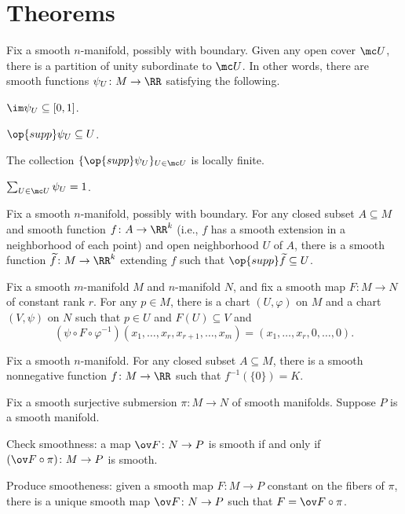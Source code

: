\documentclass{article}
\begin{document}
\section{Theorems}
\begin{theorem}
	Fix a smooth $n$-manifold, possibly with boundary. Given any open cover $\mc U$, there is a partition of unity subordinate to $\mc U$. In other words, there are smooth functions $\psi_U\colon M\to\RR$ satisfying the following.
	\begin{listalph}
		\item $\im\psi_U\subseteq[0,1]$.
		\item $\op{supp}\psi_U\subseteq U$.
		\item The collection $\{\op{supp}\psi_U\}_{U\in\mc U}$ is locally finite.
		\item $\sum_{U\in\mc U}\psi_U=1$.
	\end{listalph}
\end{theorem}
\begin{corollary}
	Fix a smooth $n$-manifold, possibly with boundary. For any closed subset $A\subseteq M$ and smooth function $f\colon A\to\RR^k$ (i.e., $f$ has a smooth extension in a neighborhood of each point) and open neighborhood $U$ of $A$, there is a smooth function $\widetilde f\colon M\to\RR^k$ extending $f$ such that $\op{supp}\widetilde f\subseteq U$.
\end{corollary}
\begin{theorem}[Rank]
	Fix a smooth $m$-manifold $M$ and $n$-manifold $N$, and fix a smooth map $F\colon M\to N$ of constant rank $r$. For any $p\in M$, there is a chart $(U,\varphi)$ on $M$ and a chart $(V,\psi)$ on $N$ such that $p\in U$ and $F(U)\subseteq V$ and
	\[\left(\psi\circ F\circ\varphi^{-1}\right)(x_1,\ldots,x_r,x_{r+1},\ldots,x_m)=(x_1,\ldots,x_r,0,\ldots,0).\]
\end{theorem}
\begin{remark}
	Fix a smooth $n$-manifold. For any closed subset $A\subseteq M$, there is a smooth nonnegative function $f\colon M\to\RR$ such that $f^{-1}(\{0\})=K$.
\end{remark}
\begin{theorem}
	Fix a smooth surjective submersion $\pi\colon M\to N$ of smooth manifolds. Suppose $P$ is a smooth manifold.
	\begin{listalph}
		\item Check smoothness: a map $\ov F\colon N\to P$ is smooth if and only if $(\ov F\circ\pi)\colon M\to P$ is smooth.
		\item Produce smootheness: given a smooth map $F\colon M\to P$ constant on the fibers of $\pi$, there is a unique smooth map $\ov F\colon N\to P$ such that $F=\ov F\circ\pi$. 
	\end{listalph}
\end{theorem}
\end{document}
